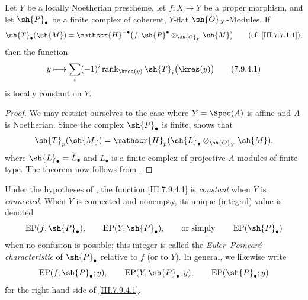 \begin{theorem}[7.9.4]
\label{III.7.9.4}
Let $Y$ be a locally Noetherian prescheme, let
$f:X\to Y$ be a proper morphism, and let
$\sh{P}_\bullet$ be a finite complex of coherent,
$Y$-flat $\sh{O}_X$-Modules.  If
\[
  \sh{T}_\bullet(\sh{M})
  =
  \mathscr{H}^{-\bullet}
    \bigl(f,\sh{P}^\bullet
      \otimes_{\sh{O}_Y}\sh{M}\bigr)
  \qquad\text{\rm(cf.~\eqref{III.7.7.1.1})},
\]
then the function
\[
  y\longmapsto
  \sum_i(-1)^i
    \operatorname{rank}_{\kres(y)}
      \sh{T}_i\bigl(\kres(y)\bigr)
  \tag{7.9.4.1}\label{III.7.9.4.1}
\]
is locally constant on $Y$.
\end{theorem}

\begin{proof}
We may restrict ourselves to the case where
$Y=\Spec(A)$ is affine and $A$ is Noetherian.  Since the
complex $\sh{P}_\bullet$ is finite, 
shows that
\[
  \sh{T}_p(\sh{M})
  =
  \mathscr{H}_p(\sh{L}_\bullet\otimes_{\sh{O}_Y}\sh{M}),
\]
where $\sh{L}_\bullet=\widetilde{L}_\bullet$ and
$L_\bullet$ is a finite complex of projective $A$-modules
of finite type.  The theorem now follows from
.
\end{proof}

\begin{env}[7.9.5]
\label{III.7.9.5}
Under the hypotheses of , the function
\eqref{III.7.9.4.1} is \emph{constant} when $Y$ is
\emph{connected}.  When $Y$ is connected and nonempty, its
unique (integral) value is denoted
\[
  \operatorname{EP}(f,\sh{P}_\bullet),\qquad
  \operatorname{EP}(Y,\sh{P}_\bullet),
  \qquad\text{or simply}\qquad
  \operatorname{EP}(\sh{P}_\bullet)
\]
when no confusion is possible; this integer is called the
\emph{Euler--Poincar\'e characteristic} of
$\sh{P}_\bullet$ relative to $f$ (or to $Y$).  In general,
we likewise write
\[
  \operatorname{EP}(f,\sh{P}_\bullet;y),\qquad
  \operatorname{EP}(Y,\sh{P}_\bullet;y),\qquad
  \operatorname{EP}(\sh{P}_\bullet;y)
\]
for the right-hand side of \eqref{III.7.9.4.1}.
\end{env}


